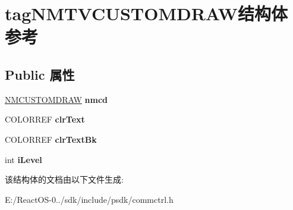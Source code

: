 \hypertarget{structtag_n_m_t_v_c_u_s_t_o_m_d_r_a_w}{}\section{tag\+N\+M\+T\+V\+C\+U\+S\+T\+O\+M\+D\+R\+A\+W结构体 参考}
\label{structtag_n_m_t_v_c_u_s_t_o_m_d_r_a_w}
\subsection*{Public 属性}
\begin{DoxyCompactItemize}
\item 
\mbox{\label{structtag_n_m_t_v_c_u_s_t_o_m_d_r_a_w_a8cb8a46758ad78632d3b7c88aa4ae145}} 
\hyperlink{structtag_n_m_c_u_s_t_o_m_d_r_a_w_i_n_f_o}{N\+M\+C\+U\+S\+T\+O\+M\+D\+R\+AW} {\bfseries nmcd}
\item 
\mbox{\label{structtag_n_m_t_v_c_u_s_t_o_m_d_r_a_w_a175a94fdd23e17cfacccdef2b57a04db}} 
C\+O\+L\+O\+R\+R\+EF {\bfseries clr\+Text}
\item 
\mbox{\label{structtag_n_m_t_v_c_u_s_t_o_m_d_r_a_w_aadfb04864603a3ecfcb80267685254aa}} 
C\+O\+L\+O\+R\+R\+EF {\bfseries clr\+Text\+Bk}
\item 
\mbox{\label{structtag_n_m_t_v_c_u_s_t_o_m_d_r_a_w_a0fbb217219a99e67c0a34b5da46bba48}} 
int {\bfseries i\+Level}
\end{DoxyCompactItemize}


该结构体的文档由以下文件生成\+:\begin{DoxyCompactItemize}
\item 
E\+:/\+React\+O\+S-\/0../sdk/include/psdk/commctrl.\+h\end{DoxyCompactItemize}
